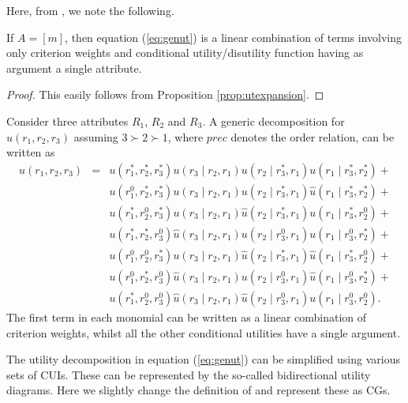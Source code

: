 Here, from \citet{Leonelli2015}, we note the following.
\begin{lemma}
\label{lemma:ut}
If $A=[m]$, then equation (\ref{eq:genut}) is a linear combination of terms involving only criterion weights and conditional utility/disutility function having as argument a single attribute. 
\end{lemma}
\begin{proof}
This easily follows from Proposition \ref{prop:utexpansion}.
\end{proof}
\begin{example}
\label{ex:genut}
Consider three attributes $R_1$, $R_2$ and $R_3$. A generic decomposition for $u(r_1,r_2,r_3)$ assuming $3\succ 2\succ 1$, where $prec$ denotes the order relation, can be written as
\begin{eqnarray*}
u(r_1,r_2,r_3)&=&u(r_1^*,r_2^*,r_3^*)u(r_3\;|\;r_2,r_1)u(r_2\;|\; r_3^*,r_1)u(r_1\;|\; r_3^*,r_2^*)+\nonumber\\
&&u(r_1^0,r_2^*,r_3^*)u(r_3\;|\;r_2,r_1)u(r_2\;|\; r_3^*,r_1)\hat{u}(r_1\;|\; r_3^*,r_2^*)+\nonumber\\
&&u(r_1^*,r_2^0,r_3^*)u(r_3\;|\;r_2,r_1)\hat{u}(r_2\;|\; r_3^*,r_1)u(r_1\;|\; r_3^*,r_2^0)+\nonumber\\
&&u(r_1^*,r_2^*,r_3^0)\hat{u}(r_3\;|\;r_2,r_1)u(r_2\;|\; r_3^0,r_1)u(r_1\;|\; r_3^0,r_2^*)+\nonumber\\
&&u(r_1^0,r_2^0,r_3^*)u(r_3\;|\;r_2,r_1)\hat{u}(r_2\;|\; r_3^*,r_1)\hat{u}(r_1\;|\; r_3^*,r_2^0)+\nonumber\\
&&u(r_1^0,r_2^*,r_3^0)\hat{u}(r_3\;|\;r_2,r_1)u(r_2\;|\; r_3^0,r_1)\hat{u}(r_1\;|\; r_3^0,r_2^*)+\nonumber\\
&&u(r_1^*,r_2^0,r_3^0)\hat{u}(r_3\;|\;r_2,r_1)\hat{u}(r_2\;|\; r_3^0,r_1)u(r_1\;|\; r_3^0,r_2^0).\label{eq:puiexample1}
\end{eqnarray*}
The first term in each monomial can be written as a linear combination of criterion weights, whilst all the other conditional utilities have a single argument.
\end{example}

The utility decomposition in equation (\ref{eq:genut}) can be simplified using various sets of \glspl{CUI}. These can be represented by the so-called bidirectional utility diagrams. Here we slightly change the definition of \citet{Abbas2010} and represent these as \glspl{CG}.

